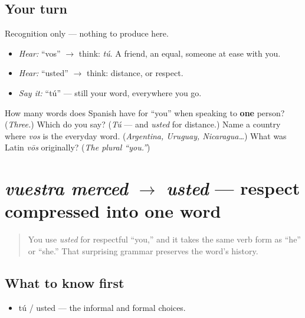 \subsection*{Your turn}
Recognition only — nothing to produce here.

\begin{itemize}
\raggedright
  \item \emph{Hear:} \textquotedblleft{}vos\textquotedblright{} $\to$ think: \emph{tú}. A friend, an equal, someone at ease with you.
  \item \emph{Hear:} \textquotedblleft{}usted\textquotedblright{} $\to$ think: distance, or respect.
  \item \emph{Say it:} \textquotedblleft{}tú\textquotedblright{} — still your word, everywhere you go.
\end{itemize}

\begin{tcolorbox}[breakable,colback=teal!4,colframe=teal!35!black,title={Before you move on}]
How many words does Spanish have for \textquotedblleft{}you\textquotedblright{} when speaking to \textbf{one} person? (\emph{Three.}) Which do you say? (\emph{Tú} — and \emph{usted} for distance.) Name a country where \emph{vos} is the everyday word. (\emph{Argentina, Uruguay, Nicaragua…}) What was Latin \emph{vōs} originally? (\emph{The plural \textquotedblleft{}you.\textquotedblright{}})
\end{tcolorbox}
\section[vuestra merced to usted]{\emph{vuestra merced} $\to$ \emph{usted} — respect compressed into one word}

\label{lesson:ES-C03-usted-origin}



\begin{quote}
You use \emph{usted} for respectful \textquotedblleft{}you,\textquotedblright{} and it takes the same verb form as \textquotedblleft{}he\textquotedblright{} or \textquotedblleft{}she.\textquotedblright{} That surprising grammar preserves the word's history.
\end{quote}

\subsection*{What to know first}
\begin{itemize}
\raggedright
  \item tú / usted — the informal and formal choices.
\end{itemize}

